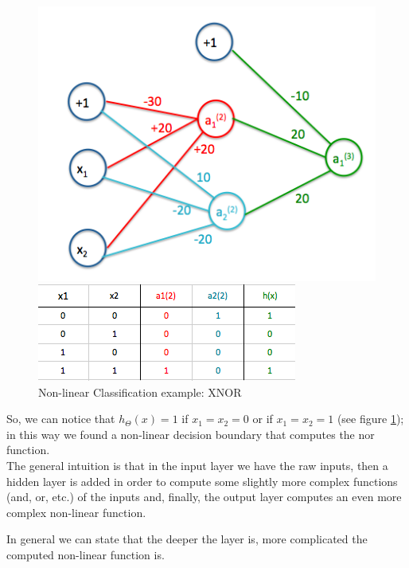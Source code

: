 \begin{figure}[H]
	\centering
	\begin{minipage}[c]{.46\textwidth}
		\centering
		\includegraphics[scale=0.35]{images/xnor}		
	\end{minipage}%
	\hspace{4mm}%
	\begin{minipage}[c]{.46\textwidth}
		\centering
		\includegraphics[scale=0.55]{images/xnor-table}
	\end{minipage}
	\caption{Non-linear Classification example: XNOR}\label{fig:xnor}
\end{figure}


So, we can notice that $h_\Theta(x) = 1$ if $x_1 = x_2 = 0$ or if $x_1 = x_2 = 1$ (see figure \ref{fig:xnor}); in this way we found a non-linear decision boundary that computes the nor function. \\
The general intuition is that in the input layer we have the raw inputs, then a hidden layer  is added in order to compute some slightly more complex functions (and, or, etc.) of the inputs and, finally, the output layer computes an even more complex non-linear function.

In general we can state that the deeper the layer is, more complicated the computed non-linear function is.


